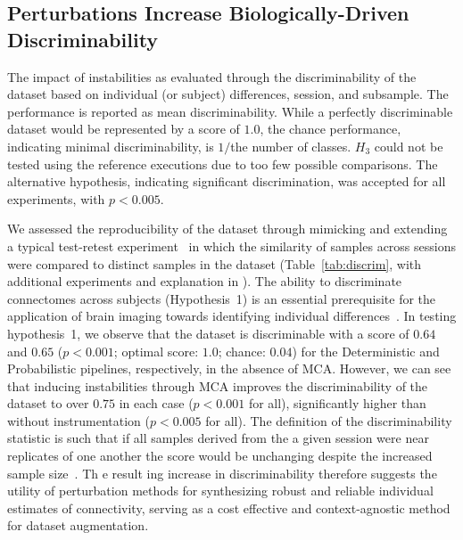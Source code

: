 \documentclass[fleqn,10pt]{SelfArx} %
\newcommand{\new}[1]{{\color{blue} #1}}
\begin{document}
\subsection*{\new{Perturbations Increase Biologically-Driven Discriminability}}
\begin{table}[ht]\centering
\caption{The impact of instabilities as evaluated through the \new{discriminability} of the dataset based on individual (or
subject) differences, session, and subsample. The performance is reported as mean discriminability. While a perfectly
\new{discriminable} dataset would be represented by a score of $1.0$, the chance performance, indicating minimal \new{discriminability}, is
$1 /$the number of classes. $H_3$ could not be tested using the reference executions due to too few possible
comparisons. The alternative hypothesis, indicating significant \new{discrimination}, was accepted for all experiments, with
$p < 0.005$.}
\vspace{5pt}

\label{tab:discrim}
\end{table}

We assessed the reproducibility of the dataset through mimicking and extending a typical test-retest
experiment~\cite{bridgeford2020elim} in which the similarity of samples across \new{sessions} were
compared to distinct samples in the dataset (Table~\ref{tab:discrim}, with additional experiments and explanation in
). The ability to \new{discriminate} connectomes across subjects (Hypothesis~1) is an essential
prerequisite for the application of brain imaging towards identifying individual differences~\cite{Dubois2016-yr}. In
testing hypothesis~1, we observe that the dataset is \new{discriminable} with a score of $0.64$ and $0.65$ ($p < 0.001$; optimal
score: $1.0$; chance: $0.04$) \new{for the Deterministic and Probabilistic pipelines, respectively, in the absence of MCA}.
However, we can see that inducing instabilities through MCA improves the \new{discriminability} of the dataset to over
$0.75$ in each case ($p < 0.001$ for all), significantly higher than without instrumentation ($p < 0.005$ for all).
\new{The definition of the discriminability statistic is such that if all samples derived from the a given session were
near replicates of one another the score would be unchanging despite the increased sample size~\cite{bridgeford2020elim}}.
Th\new{e} result\new{ing increase in discriminability} therefore suggests the utility of perturbation methods for
synthesizing robust and reliable individual estimates of connectivity, serving as a cost effective and context-agnostic
method for dataset augmentation.
\end{document}
